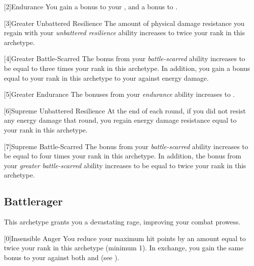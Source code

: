         [2]{Endurance} You gain a  bonus to your , and a  bonus to .

        [3]{Greater Unbattered Resilience} The amount of physical damage resistance you regain with your \textit{unbattered resilience} ability increases to twice your rank in this archetype.

        [4]{Greater Battle-Scarred} The bonus from your \textit{battle-scarred} ability increases to be equal to three times your rank in this archetype.
        In addition, you gain a bonus equal to your rank in this archetype to your  against energy damage.

        [5]{Greater Endurance} The bonuses from your \textit{endurance} ability increases to .

        [6]{Supreme Unbattered Resilience} At the end of each round, if you did not resist any energy damage that round, you regain energy damage resistance equal to your rank in this archetype.

        [7]{Supreme Battle-Scarred} The bonus from your \textit{battle-scarred} ability increases to be equal to four times your rank in this archetype.
        In addition, the bonus from your \textit{greater battle-scarred} ability increases to be equal to twice your rank in this archetype.

    \newpage
    \subsection{Battlerager}\label{Rage}
        This archetype grants you a devastating rage, improving your combat prowess.

        [0]{Insensible Anger} You reduce your maximum hit points by an amount equal to twice your rank in this archetype (minimum 1).
        In exchange, you gain the same bonus to your  against both  and  (see ).

